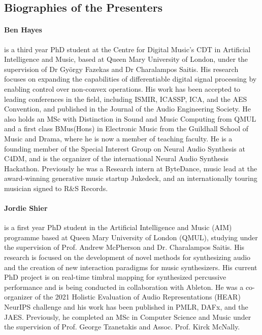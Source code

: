 \subsection*{Biographies of the Presenters}
\paragraph{Ben Hayes} is a third year PhD student at the Centre for Digital Music's CDT in Artificial Intelligence and Music, based at Queen Mary University of London, under the supervision of Dr György Fazekas and Dr Charalampos Saitis. His research focuses on expanding the capabilities of differentiable digital signal processing by enabling control over non-convex operations. His work has been accepted to leading conferences in the field, including ISMIR, ICASSP, ICA, and the AES Convention, and published in the Journal of the Audio Engineering Society. He also holds an MSc with Distinction in Sound and Music Computing from QMUL and a first class BMus(Hons) in Electronic Music from the Guildhall School of Music and Drama, where he is now a member of teaching faculty. He is a founding member of the Special Interest Group on Neural Audio Synthesis at C4DM, and is the organizer of the international Neural Audio Synthesis Hackathon. Previously he was a Research intern at ByteDance, music lead at the award-winning generative music startup Jukedeck, and an internationally touring musician signed to R\&S Records.

\paragraph{Jordie Shier} is a first year PhD student in the Artificial Intelligence and Music (AIM) programme based at Queen Mary University of London (QMUL), studying under the supervision of Prof. Andrew McPherson and Dr. Charalampos Saitis. His research is focused on the development of novel methods for synthesizing audio and the creation of new interaction paradigms for music synthesizers. His current PhD project is on real-time timbral mapping for synthesized percussive performance and is being conducted in collaboration with Ableton. He was a co-organizer of the 2021 Holistic Evaluation of Audio Representations (HEAR) NeurIPS challenge and his work has been published in PMLR, DAFx, and the JAES. Previously, he completed an MSc in Computer Science and Music under the supervision of Prof. George Tzanetakis and Assoc. Prof. Kirck McNally.


